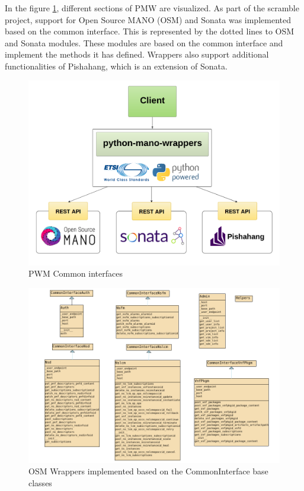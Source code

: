 In the figure \ref{fig:wrapperarch}, different sections of PMW are visualized. 
As part of the scramble project, support for Open Source MANO (OSM) and Sonata was implemented based on the common interface. 
This is represented by the dotted lines to OSM and Sonata modules. 
These modules are based on the common interface and implement the methods it has defined. 
Wrappers also support additional functionalities of Pishahang, which is an extension of Sonata. 

\begin{figure}
	\centering
	\includegraphics[width=1\linewidth]{figures/WrapperArch}
	\caption{PWM Common interfaces}
	\label{fig:wrapperarch}
\end{figure}

\begin{figure}
	\centering
	\includegraphics[width=1\linewidth]{figures/osm_class_diagram}
	\caption{OSM Wrappers implemented based on the CommonInterface base classes}
	\label{fig:osmclassdiagram}
\end{figure}

